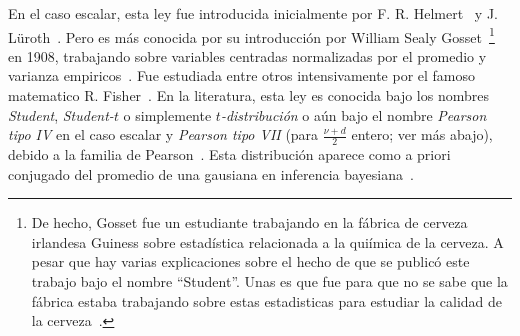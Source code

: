 \label{Sssec:MP:Student}

En   el  caso   escalar,  esta   ley   fue  introducida   inicialmente  por   F.
R. Helmert~\cite{Hel75, Hel76, She95}  y J.  L\"uroth~\cite{Lur76, Pfa96}.  Pero
es m\'as  conocida por su  introducci\'on por William  Sealy Gosset~\footnote{De
  hecho,  Gosset  fue  un  estudiante  trabajando en  la  f\'abrica  de  cerveza
  irlandesa  Guiness  sobre estad\'istica  relacionada  a  la  qui\'imica de  la
  cerveza.   A pesar  que hay  varias  explicaciones sobre  el hecho  de que  se
  public\'o este trabajo bajo el nombre ``Student''. Unas es que fue para que no
  se  sabe que  la f\'abrica  estaba  trabajando sobre  estas estadisticas  para
  estudiar  la calidad  de  la cerveza~\cite{Wen16}.\label{Foot:MP:Student}}  en
1908,  trabajando  sobre variables  centradas  normalizadas  por  el promedio  y
varianza empiricos~\cite{Stu08}.   Fue estudiada entre  otros intensivamente por
el  famoso matematico  R. Fisher~\cite{Fis25}.   En la  literatura, esta  ley es
conocida bajo  los nombres {\em  Student}, {\em Student-$t$} o  simplemente {\em
  $t$-distribuci\'on} o  a\'un bajo el nombre  {\em Pearson tipo IV}  en el caso
escalar  y {\em  Pearson tipo  VII}  (para $\frac{\nu+d}{2}$  entero; ver  m\'as
abajo), debido  a la  familia de Pearson~\cite{Pea95,  JohKot95:v1, JohKot95:v1,
  KotBal00, FanKot90}.  Esta distribuci\'on aparece como a  priori conjugado del
promedio de una gausiana en inferencia bayesiana~\cite{Rob07, KotNad04}.

